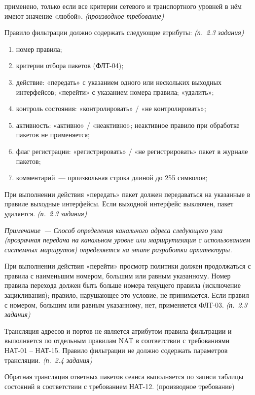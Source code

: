 \documentclass[12pt,a4paper,final]{article}
\newenvironment{reqs}
  {\begin{description}[style=sameline,leftmargin=2.2cm,labelwidth=2.0cm,
     labelsep=0.2cm,font=\normalfont\bfseries,itemsep=3pt]}
  {\end{description}}
\newcommand{\src}[1]{\textit{(п.~#1 задания)}}
\newcommand{\der}{\textit{(производное требование)}}
\begin{document}
\begin{reqs}
  применено, только если все критерии сетевого и транспортного уровней в нём
  имеют значение «любой». \der
\item[ФЛТ-07] Правило фильтрации должно содержать следующие атрибуты: \src{2.3}
  \begin{enumerate}
  \item номер правила;
  \item критерии отбора пакетов (ФЛТ-04);
  \item действие: «передать» с указанием одного или нескольких выходных
    интерфейсов; «перейти» с указанием номера правила; «удалить»;
  \item контроль состояния: «контролировать» / «не контролировать»;
  \item активность: «активно» / «неактивно»; неактивное правило при обработке
    пакетов не применяется;
  \item флаг регистрации: «регистрировать» / «не регистрировать» пакет в журнале пакетов;
  \item комментарий~— произвольная строка длиной до 255 символов;
  \end{enumerate}
\item[ФЛТ-08] При выполнении действия «передать» пакет должен передаваться на
  указанные в правиле выходные интерфейсы. Если выходной интерфейс выключен,
  пакет удаляется. \src{2.3}

  \textit{Примечание~— Способ определения канального адреса следующего узла
  (прозрачная передача на канальном уровне или маршрутизация с использованием
  системных маршрутов) определяется на этапе разработки архитектуры.}
\item[ФЛТ-09] При выполнении действия «перейти» просмотр политики должен
  продолжаться с правила с наименьшим номером, большим или равным указанному.
  Номер правила перехода должен быть больше номера текущего правила (исключение
  зацикливания); правило, нарушающее это условие, не принимается. Если правил
  с номером, большим или равным указанному, нет, применяется ФЛТ-03. \src{2.3}

\item[ФЛТ-10] Трансляция адресов и портов не является атрибутом правила
фильтрации и выполняется по отдельным правилам NAT в соответствии с
требованиями НАТ-01 -- НАТ-15. Правило фильтрации не должно содержать
параметров трансляции. \src{2.4}


\item[ФЛТ-11]Обратная трансляция ответных пакетов сеанса выполняется по
записи таблицы состояний в соответствии с требованием НАТ-12.
(производное требование)
\end{reqs}
\end{document}
